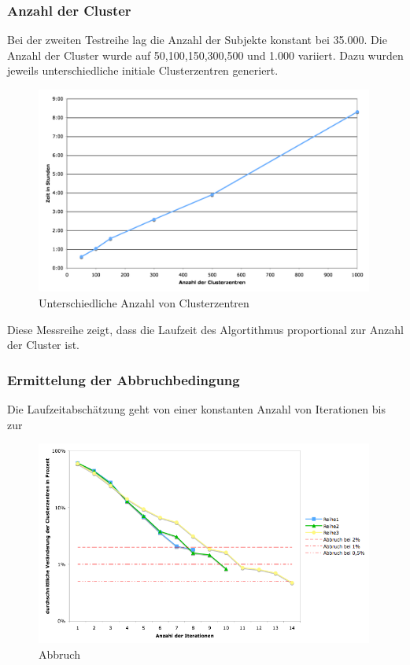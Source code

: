 \documentclass[a4paper]{llncs}
\begin{document}
\subsubsection{Anzahl der Cluster}
Bei der zweiten Testreihe lag die Anzahl der Subjekte konstant bei 35.000. Die Anzahl der Cluster wurde auf 50,100,150,300,500 und 1.000 variiert. Dazu wurden jeweils unterschiedliche initiale Clusterzentren generiert.
\begin{figure}[!ht]
\centering
\includegraphics[width=0.99\textwidth]{charts/clustercenters.png}
\caption{Unterschiedliche Anzahl von Clusterzentren}
\label{fig:centers}
\end{figure}
Diese Messreihe zeigt, dass die Laufzeit des Algortithmus proportional zur Anzahl der Cluster ist.

\subsubsection{Ermittelung der Abbruchbedingung}
Die Laufzeitabschätzung geht von einer konstanten Anzahl von Iterationen bis zur 
\begin{figure}[!ht]
\centering
\includegraphics[width=0.99\textwidth]{charts/iterations_log.png}
\caption{Abbruch}
\label{fig:iterations}
\end{figure}
\end{document}

